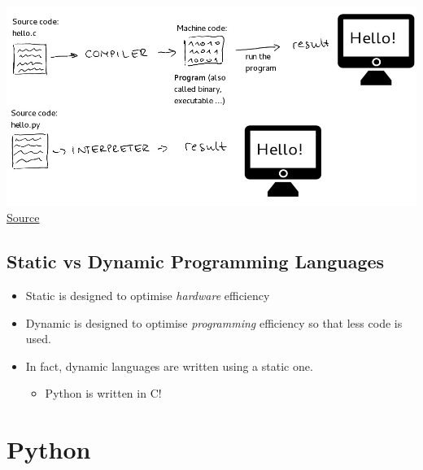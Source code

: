 \documentclass[11pt]{article}
\makeatletter
\def\maxwidth{\ifdim\Gin@nat@width>\linewidth\linewidth
    \else\Gin@nat@width\fi}
\let\Oldincludegraphics\includegraphics
\renewcommand{\includegraphics}[1]{\Oldincludegraphics[width=.8\maxwidth]{#1}}
\providecommand{\tightlist}{%
      \setlength{\itemsep}{0pt}\setlength{\parskip}{0pt}}
\makeatother
\begin{document}
    \includegraphics{figs/compiledinterpreted.jpg}
\href{https://www.google.com/url?sa=i\&rct=j\&q=\&esrc=s\&source=images\&cd=\&cad=rja\&uact=8\&ved=2ahUKEwichoGF1KXkAhVOdhoKHebmAJwQjRx6BAgBEAQ\&url=\%2Furl\%3Fsa\%3Di\%26rct\%3Dj\%26q\%3D\%26esrc\%3Ds\%26source\%3Dimages\%26cd\%3D\%26ved\%3D\%26url\%3Dhttps\%253A\%252F\%252Fmedium.com\%252Ffrom-the-scratch\%252Fstop-it-there-are-no-compiled-and-interpreted-languages-512f84756664\%26psig\%3DAOvVaw0CqS9Nmdo4wbc9J-p4WtL-\%26ust\%3D1567083827896505\&psig=AOvVaw0CqS9Nmdo4wbc9J-p4WtL-\&ust=1567083827896505}{Source}

    \hypertarget{static-vs-dynamic-programming-languages}{%
\subsection{Static vs Dynamic Programming
Languages}\label{static-vs-dynamic-programming-languages}}

\begin{itemize}
\tightlist
\item
  Static is designed to optimise \emph{hardware} efficiency
\item
  Dynamic is designed to optimise \emph{programming} efficiency so that
  less code is used.
\item
  In fact, dynamic languages are written using a static one.

  \begin{itemize}
  \tightlist
  \item
    Python is written in C!
  \end{itemize}
\end{itemize}

    \hypertarget{python}{%
\section{Python}\label{python}}
\end{document}

